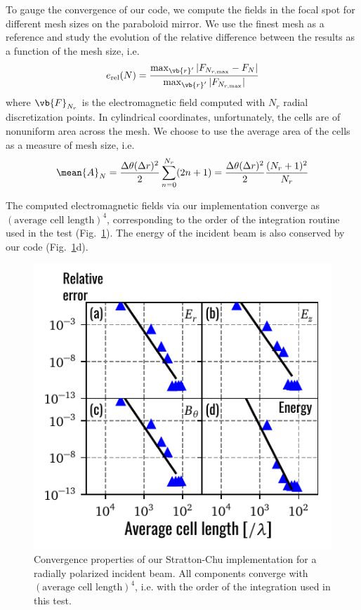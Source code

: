 \documentclass[11pt,SymmetricalJury]{inrsthesis/inrsthesis}
\begin{document}
To gauge the convergence of our code, we compute the fields in the focal spot
for different mesh sizes on the paraboloid mirror. We use the finest mesh
as a reference and study the evolution of the relative difference between
the results as a function of the mesh size, i.e.
  \begin{equation}
    e_\text{rel}(N) = \frac{\max_{\vb{r}'}|F_{N_{r,\text{max}}}-F_{N}|}
                            {\max_{\vb{r}'}|F_{N_{r,\text{max}}}|}
  \end{equation}
where $\vb{F}_{N_r}$ is the electromagnetic field computed with $N_r$
radial discretization points. In cylindrical coordinates, unfortunately,
the cells are of nonuniform area across the mesh. We choose to use the average
area of the cells as a measure of mesh size, i.e.
  \begin{equation}
    \mean{A}_N = \frac{\Delta\theta(\Delta r)^2}{2}\sum_{n=0}^{N_r} (2n+1)
               = \frac{\Delta\theta(\Delta r)^2}{2}\frac{(N_r+1)^2}{N_r}
  \end{equation}

The computed electromagnetic fields via our implementation converge as
$(\text{average cell length})^4$, corresponding to the order of the
integration routine used in the test (Fig.~\ref{fig:sc.convergence-radial}).
The energy of the incident beam is also conserved by our code (Fig.~\ref{fig:sc.convergence-radial}d).

\begin{figure}
  \centering
  \includegraphics{figs/ConvergenceAll.pdf}
  \caption[Convergence properties of our Stratton-Chu implementation (radial polarization).]
  {Convergence properties of our Stratton-Chu implementation for a radially polarized
  incident beam. All components converge with $(\text{average cell length})^4$,
  i.e. with the order of the integration used in this test.}
  \label{fig:sc.convergence-radial}
\end{figure}
\end{document}
